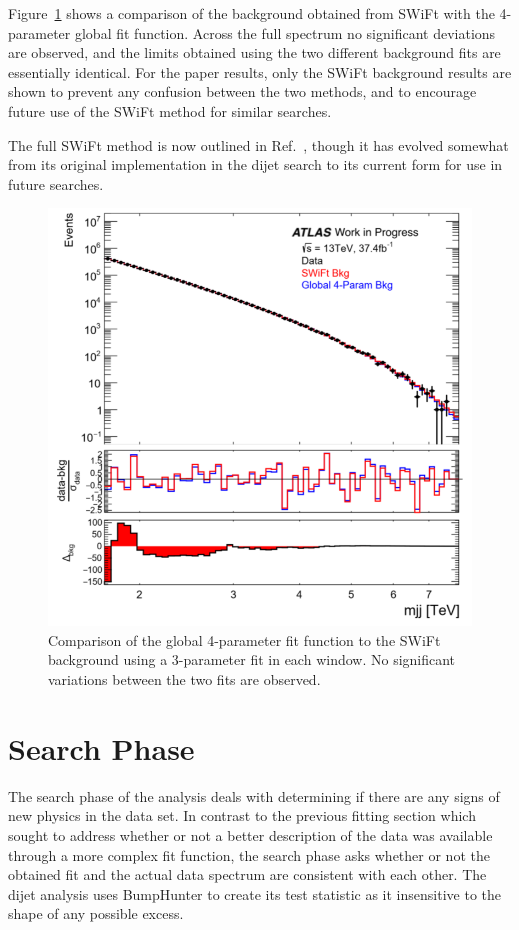 Figure~\ref{fig:SwiftVsGlobal} shows a comparison of the background obtained from SWiFt with the 4-parameter global fit function.  Across the full spectrum no significant deviations are observed, and the limits obtained using the two different background fits are essentially identical.  For the paper results, only the SWiFt background results are shown to prevent any confusion between the two methods, and to encourage future use of the SWiFt method for similar searches.

The full SWiFt method is now outlined in Ref.~\cite{SWiFt}, though it has evolved somewhat from its original implementation in the dijet search to its current form for use in future searches.

\begin{figure}[h!]
	\centering
	\includegraphics[width=0.75\columnwidth]{figures/SearchStrategy/SwiftVsGlobal.png}
	\caption{Comparison of the global 4-parameter fit function to the SWiFt background using a 3-parameter fit in each window.  No significant variations between the two fits are observed.}
	\label{fig:SwiftVsGlobal}
\end{figure}

\section{Search Phase}

The search phase of the analysis deals with determining if there are any signs of new physics in the data set.  In contrast to the previous fitting section which sought to address whether or not a better description of the data was available through a more complex fit function, the search phase asks whether or not the obtained fit and the actual data spectrum are consistent with each other.  The dijet analysis uses BumpHunter to create its test statistic as it insensitive to the shape of any possible excess.

